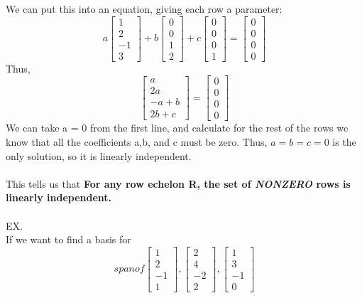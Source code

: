 \documentclass[twocolumn,10pt]{article}
\begin{document}
We can put this into an equation, giving each row a parameter: $$a\begin{bmatrix}1 \\ 2 \\ -1 \\ 3
\end{bmatrix} + b\begin{bmatrix} 0\\ 0 \\ 1 \\ 2 \end{bmatrix} + c \begin{bmatrix} 0\\ 0 \\ 0 \\1 \end{bmatrix} = \begin{bmatrix} 0\\ 0\\0\\0\end{bmatrix}$$ Thus,
$$\begin{bmatrix}a \\ 2a \\ -a + b \\ 2b + c \end{bmatrix} = \begin{bmatrix} 0 \\ 0 \\ 0 \\0 \end{bmatrix}$$ We can take a = 0 from the first line, and calculate for the rest of the rows we know that all the coefficients a,b, and c must be zero. Thus, $a=b=c=0$ is the only solution, so it is linearly independent.\\\\ This tells us that \textbf{For any row echelon R, the set of \textit{NONZERO} rows is linearly independent.}\\\\EX.\\
If we want to find a basis for $$span of \begin{bmatrix}1 \\ 2 \\ -1 \\ 1
\end{bmatrix}, \begin{bmatrix} 2\\ 4 \\ -2 \\ 2 \end{bmatrix}, \begin{bmatrix} 1\\ 3 \\ -1 \\0 \end{bmatrix}$$
\end{document}
